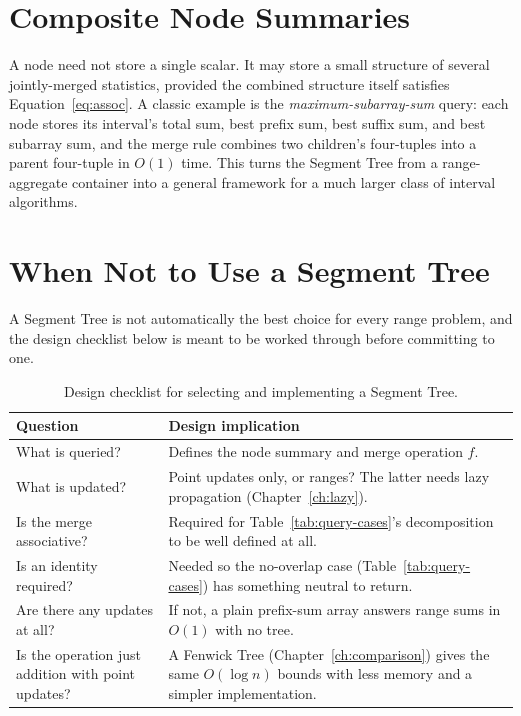 \documentclass[
  11pt,
  a4paper,
  twoside=false,
  numbers=noenddot,
  headings=big,
  parskip=half,
  toc=bibliography,
  toc=listof,
  bibliography=totoc
]{scrreprt}
\newcounter{example}[chapter]
\newcommand{\Oh}[1]{O\!\left(#1\right)}
\newcommand{\tblhead}[1]{\textbf{\sffamily #1}}
\begin{document}
\section{Composite Node Summaries}
A node need not store a single scalar. It may store a small structure of several jointly-merged statistics, provided the combined structure itself satisfies Equation~\eqref{eq:assoc}. A classic example is the \emph{maximum-subarray-sum} query: each node stores its interval's total sum, best prefix sum, best suffix sum, and best subarray sum, and the merge rule combines two children's four-tuples into a parent four-tuple in $\Oh{1}$ time. This turns the Segment Tree from a range-aggregate container into a general framework for a much larger class of interval algorithms.

\section{When Not to Use a Segment Tree}
A Segment Tree is not automatically the best choice for every range problem, and the design checklist below is meant to be worked through before committing to one.

\begin{table}[H]
\centering
\caption{Design checklist for selecting and implementing a Segment Tree.}
\label{tab:checklist}
\begin{tabular}{>{\raggedright\arraybackslash}p{4.2cm}p{8.0cm}}
\toprule
\tblhead{Question} & \tblhead{Design implication} \\
\midrule
What is queried? & Defines the node summary and merge operation $f$. \\
What is updated? & Point updates only, or ranges? The latter needs lazy propagation (Chapter~\ref{ch:lazy}). \\
Is the merge associative? & Required for Table~\ref{tab:query-cases}'s decomposition to be well defined at all. \\
Is an identity required? & Needed so the no-overlap case (Table~\ref{tab:query-cases}) has something neutral to return. \\
Are there any updates at all? & If not, a plain prefix-sum array answers range sums in $\Oh{1}$ with no tree. \\
Is the operation just addition with point updates? & A Fenwick Tree (Chapter~\ref{ch:comparison}) gives the same $\Oh{\log n}$ bounds with less memory and a simpler implementation. \\
\bottomrule
\end{tabular}
\end{table}
\end{document}
